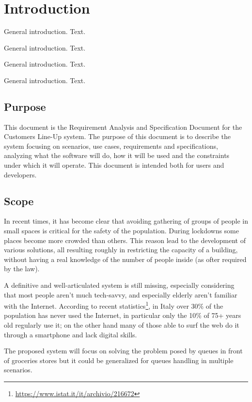 \section{Introduction}\label{sec:intro}

General introduction. Text.

General introduction. Text.

General introduction. Text.

General introduction. Text.

\subsection{Purpose}
This document is the Requirement Analysis and Specification Document for the Customers Line-Up system.
The purpose of this document is to describe the system focusing on scenarios, use cases, requirements and 
specifications, analyzing what the software will do, how it will be used and the constraints under which it
will operate. This document is intended both for users and developers.

\subsection{Scope}
In recent times, it has become clear that avoiding gathering of groups of people in small spaces is critical
for the safety of the population. During lockdowns some places become more crowded than others. 
This reason lead to the development of various solutions, all resulting roughly in restricting the capacity
of a building, without having a real knowledge of the number of people inside (as ofter required by the law).

A definitive and well-articulated system is still missing, especially considering that most people aren't much
tech-savvy, and especially elderly aren't familiar with the Internet.
According to recent statistics\footnote[1]{\url{https://www.istat.it/it/archivio/216672}}, in Italy over 30\% of the population has
never used the Internet, in particular only the 10\% of 75+ years old regularly use it; on the other hand many of
those able to surf the web do it through a smartphone and lack digital skills.

The proposed system will focus on solving the problem posed by queues in front of groceries stores but it could
be generalized for queues handling in multiple scenarios.


